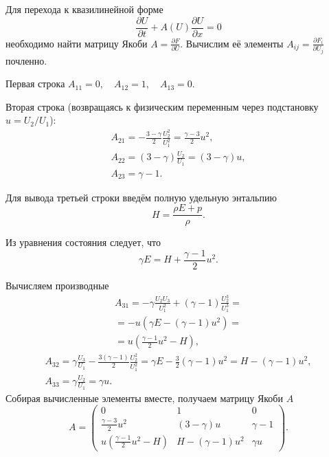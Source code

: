 \documentclass[a4paper,14pt]{extarticle}
\theoremstyle{theorem}
\theoremstyle{lemma}
\begin{document}
Для перехода к квазилинейной форме 
\begin{equation}
    \frac{\partial U}{\partial t} + A(U)\frac{\partial U}{\partial x} = 0
\end{equation}
необходимо найти матрицу Якоби $A = \frac{\partial F}{\partial U}$. Вычислим её элементы $A_{ij} = \frac{\partial F_i}{\partial U_j}$ почленно.

Первая строка $ A_{11} = 0, \quad A_{12} = 1, \quad A_{13} = 0.$

Вторая строка (возвращаясь к физическим переменным через подстановку $u = U_2/U_1$):
\begin{gather}
    A_{21} = -\frac{3-\gamma}{2}\frac{U_2^2}{U_1^2} = \frac{\gamma-3}{2}u^2, \\
    A_{22} = (3-\gamma)\frac{U_2}{U_1} = (3-\gamma)u, \\
    A_{23} = \gamma - 1.
\end{gather}

Для вывода третьей строки введём полную удельную энтальпию
\begin{equation}
    H = \frac{\rho E+p}{\rho}.
\end{equation}

Из уравнения состояния следует, что 
\begin{equation}
    \gamma E = H + \frac{\gamma-1}{2}u^2.
\end{equation} 

Вычисляем производные
\begin{equation}
\begin{gathered}
    A_{31} = -\gamma \frac{U_2 U_3}{U_1^2} + (\gamma - 1)\frac{U_2^3}{U_1^3} = \\
    = -u \left( \gamma E - (\gamma-1)u^2 \right) = \\
    = u\left(\frac{\gamma-1}{2}u^2 - H\right),
\end{gathered}
\end{equation}
\vspace{-0.7 cm}
\begin{gather}
    A_{32} = \gamma \frac{U_3}{U_1} - \frac{3(\gamma-1)}{2}\frac{U_2^2}{U_1^2} = \gamma E - \frac{3}{2}(\gamma-1)u^2 = H - (\gamma-1)u^2, \\
    A_{33} = \gamma \frac{U_2}{U_1} = \gamma u.
\end{gather}   
Собирая вычисленные элементы вместе, получаем матрицу Якоби $A$
\begin{equation}
    A = \begin{pmatrix}
    0 & 1 & 0 \\
    \frac{\gamma-3}{2}u^2 & (3-\gamma)u & \gamma-1 \\
    u\left(\frac{\gamma-1}{2}u^2 - H\right) & H - (\gamma-1)u^2 & \gamma u
    \end{pmatrix}.
\end{equation}
\end{document}
